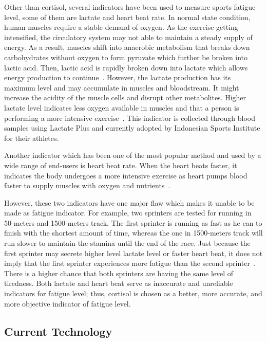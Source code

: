 \documentclass[journal]{IEEEtran}
\begin{document}
Other than cortisol, several indicators have been used to measure sports fatigue level, some of them are lactate and heart beat rate. In normal state condition, human muscles require a stable demand of oxygen. As the exercise getting intensified, the circulatory system may not able to maintain a steady supply of energy. As a result, muscles shift into anaerobic metabolism that breaks down carbohydrates without oxygen to form pyruvate which further be broken into lactic acid. Then, lactic acid is rapidly broken down into lactate which allows energy production to continue~\cite{ExerciseMetabolic}. However, the lactate production has its maximum level and may accumulate in muscles and bloodstream. It might increase the acidity of the muscle cells and disrupt other metabolites. Higher lactate level indicates less oxygen available in muscles and that a person is performing a more intensive exercise~\cite{ExerciseMetabolic}. This indicator is collected through blood samples using Lactate Plus and currently adopted by Indonesian Sports Institute for their athletes.

Another indicator which has been one of the most popular method and used by a wide range of end-users is heart beat rate. When the heart beats faster, it indicates the body undergoes a more intensive exercise as heart pumps blood faster to supply muscles with oxygen and nutrients~\cite{StrenuousExercise}. 

However, these two indicators have one major flaw which makes it unable to be made as fatigue indicator. For example, two sprinters are tested for running in 50-meters and 1500-meters track. The first sprinter is running as fast as he can to finish with the shortest amount of time, whereas the one in 1500-meters track will run slower to maintain the stamina until the end of the race. Just because the first sprinter may secrete higher level lactate level or faster heart beat, it does not imply that the first sprinter experiences more fatigue than the second sprinter~\cite{ExerciseLactate}. There is a higher chance that both sprinters are having the same level of tiredness. Both lactate and heart beat serve as inaccurate and unreliable indicators for fatigue level; thus, cortisol is chosen as a better, more accurate, and more objective indicator of fatigue level. 

\subsection{Current Technology}
\end{document}
